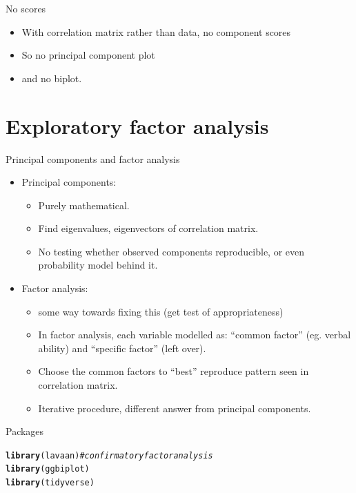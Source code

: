 \documentclass[unknownkeysallowed]{beamer}\usepackage[]{graphicx}\usepackage[]{color}
\makeatletter
\newcommand{\hlcom}[1]{\textcolor[rgb]{0.678,0.584,0.686}{\textit{#1}}}%
\newcommand{\hlstd}[1]{\textcolor[rgb]{0.345,0.345,0.345}{#1}}%
\newcommand{\hlkwd}[1]{\textcolor[rgb]{0.737,0.353,0.396}{\textbf{#1}}}%
\newenvironment{kframe}{%
 \def\at@end@of@kframe{}%
 \ifinner\ifhmode%
  \def\at@end@of@kframe{\end{minipage}}%
  \begin{minipage}{\columnwidth}%
 \fi\fi%
 \def\FrameCommand##1{\hskip\@totalleftmargin \hskip-\fboxsep
 \colorbox{shadecolor}{##1}\hskip-\fboxsep
     \hskip-\linewidth \hskip-\@totalleftmargin \hskip\columnwidth}%
 \MakeFramed {\advance\hsize-\width
   \@totalleftmargin\z@ \linewidth\hsize
   \@setminipage}}%
 {\par\unskip\endMakeFramed%
 \at@end@of@kframe}
\newenvironment{knitrout}{}{} %
\makeatother
\begin{document}
\begin{frame}[fragile]{No scores}
  
  \begin{itemize}
  \item With correlation matrix rather than data, no component scores
  \item So no principal component plot
  \item and no biplot. 
  \end{itemize}


  
\end{frame}


\section{Exploratory factor analysis}
\frame{\sectionpage}


\begin{frame}[fragile]{Principal components and factor analysis}

  \begin{itemize}
  \item Principal components: 
    \begin{itemize}
    \item Purely mathematical.
    \item Find eigenvalues, eigenvectors of correlation matrix.
    \item No testing whether observed components reproducible, or even probability model behind it.
    \end{itemize}
  \item Factor analysis: 
    \begin{itemize}
    \item some way towards fixing this (get test of appropriateness)
    \item In factor analysis, each variable modelled as: ``common factor'' (eg. verbal ability) and ``specific factor'' (left over).
    \item Choose the common factors to ``best'' reproduce pattern seen in correlation matrix.
    \item Iterative procedure, different answer from principal components.
    \end{itemize}

  \end{itemize}

\end{frame}

\begin{frame}[fragile]{Packages}
  
\begin{knitrout}
\color{fgcolor}\begin{kframe}
\begin{alltt}
\hlkwd{library}\hlstd{(lavaan)} \hlcom{# confirmatory factor analysis}
\hlkwd{library}\hlstd{(ggbiplot)}
\hlkwd{library}\hlstd{(tidyverse)}
\end{alltt}
\end{kframe}
\end{knitrout}
  
\end{frame}
\end{document}
